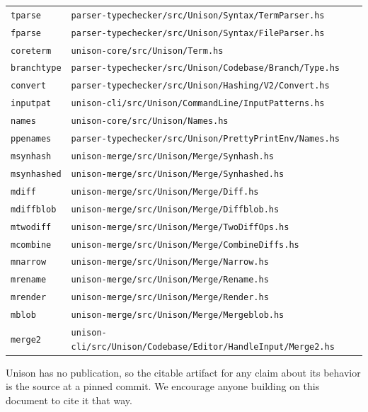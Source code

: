\documentclass[11pt]{article}
\theoremstyle{definition}
\theoremstyle{plain}
\theoremstyle{remark}
\begin{document}
\begin{center}
\begin{tabular}{@{}ll@{}}
\texttt{tparse}   & \texttt{parser-typechecker/src/Unison/Syntax/TermParser.hs} \\
\texttt{fparse}   & \texttt{parser-typechecker/src/Unison/Syntax/FileParser.hs} \\
\texttt{coreterm} & \texttt{unison-core/src/Unison/Term.hs} \\
\texttt{branchtype} & \texttt{parser-typechecker/src/Unison/Codebase/Branch/Type.hs} \\
\texttt{convert}  & \texttt{parser-typechecker/src/Unison/Hashing/V2/Convert.hs} \\
\texttt{inputpat} & \texttt{unison-cli/src/Unison/CommandLine/InputPatterns.hs} \\
\texttt{names}    & \texttt{unison-core/src/Unison/Names.hs} \\
\texttt{ppenames} & \texttt{parser-typechecker/src/Unison/PrettyPrintEnv/Names.hs} \\
\texttt{msynhash} & \texttt{unison-merge/src/Unison/Merge/Synhash.hs} \\
\texttt{msynhashed} & \texttt{unison-merge/src/Unison/Merge/Synhashed.hs} \\
\texttt{mdiff}    & \texttt{unison-merge/src/Unison/Merge/Diff.hs} \\
\texttt{mdiffblob} & \texttt{unison-merge/src/Unison/Merge/Diffblob.hs} \\
\texttt{mtwodiff} & \texttt{unison-merge/src/Unison/Merge/TwoDiffOps.hs} \\
\texttt{mcombine} & \texttt{unison-merge/src/Unison/Merge/CombineDiffs.hs} \\
\texttt{mnarrow}  & \texttt{unison-merge/src/Unison/Merge/Narrow.hs} \\
\texttt{mrename}  & \texttt{unison-merge/src/Unison/Merge/Rename.hs} \\
\texttt{mrender}  & \texttt{unison-merge/src/Unison/Merge/Render.hs} \\
\texttt{mblob}    & \texttt{unison-merge/src/Unison/Merge/Mergeblob.hs} \\
\texttt{merge2}   & \texttt{unison-cli/src/Unison/Codebase/Editor/HandleInput/Merge2.hs} \\
\bottomrule
\end{tabular}
\end{center}

Unison has no publication, so the citable artifact for any claim about its behavior is the source at
a pinned commit. We encourage anyone building on this document to cite it that way.
\end{document}
